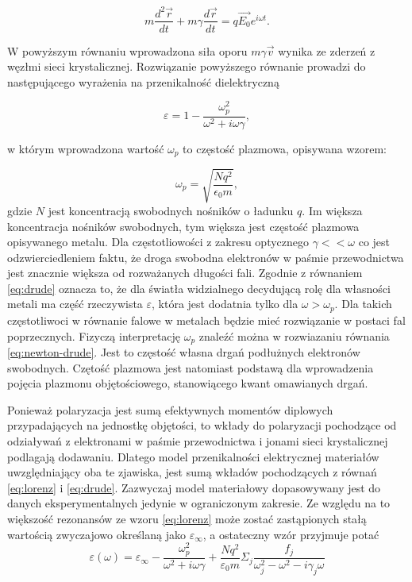\begin{equation}
m \frac{d^2\vec{r}}{dt} + m \gamma \frac{d\vec{r}}{dt} = q \vec{E_0}e^{i\omega t}.
\label{eq:newton-drude}
\end{equation}

W powyższym równaniu wprowadzona siła oporu $m \gamma \vec{v}$ wynika ze zderzeń z węzłmi sieci krystalicznej. Rozwiązanie powyższego równanie prowadzi do następującego wyrażenia na przenikalność dielektryczną

\begin{equation}
\varepsilon= 1 - \frac{\omega_p^2}{\omega^2+i\omega \gamma},
\label{eq:drude}
\end{equation}

w którym wprowadzona wartość $\omega_p$ to częstość plazmowa, opisywana wzorem:

\begin{equation}
\omega_p = \sqrt{\frac{N q^2}{\epsilon_0 m}},
\label{eq:omega-plazmowa}
\end{equation}
gdzie $N$ jest koncentracją swobodnych nośników o ładunku $q$. Im większa koncentracja nośników swobodnych, tym większa jest częstość plazmowa opisywanego metalu.  Dla częstotliowości z zakresu optycznego $\gamma<<\omega$ co jest odzwierciedleniem faktu, że droga swobodna elektronów w paśmie przewodnictwa jest znacznie większa od rozważanych długości fali. Zgodnie z równaniem  \ref{eq:drude} oznacza to, że dla światła widzialnego decydującą rolę dla własności metali ma część rzeczywista $\varepsilon$, która jest dodatnia tylko dla $\omega>\omega_p$. Dla takich częstotliwoci w równanie falowe w metalach będzie mieć rozwiązanie w postaci fal poprzecznych. Fizyczą interpretację $\omega_p$ znaleźć można w rozwiazaniu równania \ref{eq:newton-drude}. Jest to częstość własna drgań podłużnych elektronów swobodnych. Czętość plazmowa jest natomiast podstawą dla wprowadzenia pojęcia plazmonu objętościowego, stanowiącego kwant omawianych drgań.

Ponieważ polaryzacja jest sumą efektywnych momentów diplowych przypadających na jednostkę objętości, to wkłady do polaryzacji pochodzące od odziaływań z elektronami w paśmie przewodnictwa i jonami sieci krystalicznej podlagają dodawaniu. Dlatego model przenikalności elektrycznej materiałów uwzględniający oba te zjawiska, jest sumą wkładów pochodzących z równań \ref{eq:lorenz} i \ref{eq:drude}. Zazwyczaj model materiałowy dopasowywany jest do danych eksperymentalnych jedynie w ograniczonym zakresie. Ze względu na to większość rezonansów ze wzoru \ref{eq:lorenz} może zostać zastąpionych stałą wartością zwyczajowo określaną jako $\varepsilon_\infty$, a ostateczny wzór przyjmuje potać
\begin{equation}
\varepsilon(\omega)=\varepsilon_\infty- \frac{\omega_p^2}{\omega^2+i\omega\gamma} +\frac{Nq^2}{\varepsilon_0 m} \Sigma_j \frac{f_j}{\omega_j^2-\omega^2-i\gamma_j\omega}
\label{eq:lorenz-drude}
\end{equation}
